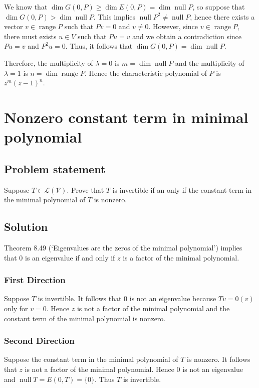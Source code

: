\documentclass{article}
\begin{document}
We know that $\operatorname{dim}G(0,P)\geq \operatorname{dim}E(0,P)=\operatorname{dim}\operatorname{null}P$, so suppose that \newline $\operatorname{dim}G(0,P)> \operatorname{dim}\operatorname{null}P$. 
This implies $\operatorname{null}P^2\neq\operatorname{null}P$, hence there exists a vector $v\in\operatorname{range}P$ such that $Pv=0$ and $v\neq 0$. 
However, since $v\in\operatorname{range}P$, there must exists $u\in V$ such that $Pu=v$ and we obtain a contradiction since $Pu=v$ and $P^2u=0$. 
Thus, it follows that $\operatorname{dim}G(0,P)=\operatorname{dim}\operatorname{null}P$.

Therefore, the multiplicity of $\lambda=0$ is $m=\operatorname{dim}\operatorname{null}P$ and the multiplicity of $\lambda=1$ is $n=\operatorname{dim}\operatorname{range}P$. Hence the characteristic polynomial of $P$ is $z^m(z-1)^n$.

\clearpage

\section{Nonzero constant term in minimal polynomial}
\subsection*{Problem statement}
Suppose $T\in\mathcal{L(V)}$. Prove that $T$ is invertible if an only if the constant term in the minimal polynomial of $T$ is nonzero.

\subsection*{Solution}
Theorem 8.49 (`Eigenvalues are the zeros of the minimal polynomial') implies that $0$ is an eigenvalue if and only if $z$ is a factor of the minimal polynomial.

\subsubsection{First Direction}
Suppose $T$ is invertible. It follows that $0$ is not an eigenvalue because $Tv=0(v)$ only for $v=0$. Hence $z$ is not a factor of the minimal polynomial and the constant term of the minimal polynomial is nonzero.

\subsubsection{Second Direction}
Suppose the constant term in the minimal polynomial of $T$ is nonzero. It follows that $z$ is not a factor of the minimal polynomial. Hence $0$ is not an eigenvalue and $\operatorname{null}T=E(0,T)=\{0\}$. Thus $T$ is invertible.
\end{document}
